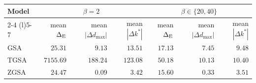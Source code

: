 \begin{tabular}{@{}lrrrrrr@{}}
  \toprule
  Model & \multicolumn{3}{c}{$\beta=2$} & \multicolumn{3}{c}{$\beta\in\{20,40\}$} \\
  \cmidrule(lr){2-4} \cmidrule(l){5-7}
  & mean $\Delta_{\rm E}$ & mean $|\Delta d_{\max}|$ & mean $|\Delta k^*|$ & mean $\Delta_{\rm E}$ & mean $|\Delta d_{\max}|$ & mean $|\Delta k^*|$ \\
  \midrule
  GSA & $25.31$ & $9.13$ & $13.51$ & $17.13$ & $7.45$ & $9.48$ \\
  TGSA & $7155.69$ & $188.24$ & $123.08$ & $50.18$ & $10.13$ & $10.40$ \\
  ZGSA & $24.47$ & $0.09$ & $3.42$ & $15.60$ & $0.33$ & $3.51$ \\
  \bottomrule
\end{tabular}
